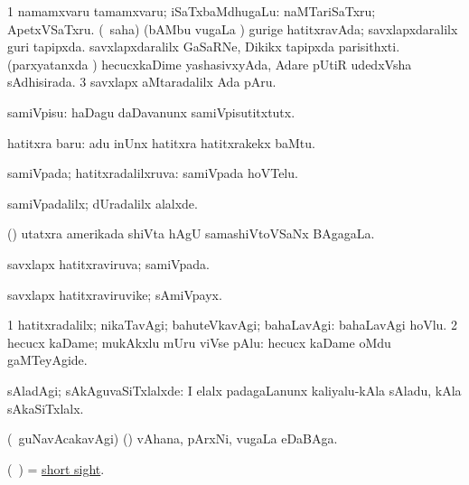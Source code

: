 \noindent
\gl{\pagu}
\bmng
\bnum
\num{1}  namamxvaru tamamxvaru; iSaTxbaMdhugaLu: naMTariSaTxru; ApetxVSaTxru. 
  (\rUpa\ saha) 
\banum
{} (bAMbu \mo vugaLa \vi) gurige hatitxravAda; savxlapxdaralilx guri tapipxda. 
 savxlapxdaralilx GaSaRNe, Dikikx tapipxda parisithxti. 
 (parxyatanxda \vi) hecucxkaDime yashasivxyAda, Adare pUtiR udedxVsha sAdhisirada. 
\eanum
\numie
\num{3}  savxlapx aMtaradalilx Ada pAru. 
\enum
\emng
\eentry

\bentry
{}
\gl{\sakirx}
\bmng
samiVpisu:  haDagu daDavanunx samiVpisutitxtutx. 
\emng

\noindent
\gl{\akirx}
\bmng
hatitxra baru:  adu inUnx hatitxra hatitxrakekx baMtu. 
\emng
\eentry

\bentry
{}
\gl{\gu}
\bmng
samiVpada; hatitxradalilxruva:  samiVpada hoVTelu. 
\emng
\eentry

\bentry
{}
\gl{\kirxvi}
\bmng
samiVpadalilx; dUradalilx alalxde. 
\emng
\eentry

\bentry
{}
\gl{\gu}
\bmng
(\pArxvi) utatxra amerikada shiVta hAgU samashiVtoVSaNx BAgagaLa. 
\emng
\eentry

\bentry
{}
\gl{\gu}
\bmng
savxlapx hatitxraviruva; samiVpada. 
\emng
\eentry

\bentry
{}
\gl{\nA}
\bmng
savxlapx hatitxraviruvike; sAmiVpayx. 
\emng
\eentry

\bentry
{}
\gl{\kirxvi}
\bmng
\bnum
\num{1} hatitxradalilx; nikaTavAgi; bahuteVkavAgi; bahaLavAgi:  bahaLavAgi hoVlu. 
\num{2} hecucx kaDame; mukAkxlu mUru viVse pAlu:  hecucx kaDame oMdu gaMTeyAgide. 
\enum
\emng

\noindent
\gl{\pagu}
\bmng
  sAladAgi; sAkAguvaSiTxlalxde:  I elalx padagaLanunx kaliyalu-kAla sAladu, kAla sAkaSiTxlalx. 
\emng
\eentry

\bentry
{}
\gl{\nA}
\bmng
(\sA\ guNavAcakavAgi) (\birx) vAhana, pArxNi, \mo vugaLa eDaBAga. 
\emng
\eentry

\bentry
{}
\gl{\nA}
\bmng
(\kanmu\ \ame) = \hyperref{kandict_s.pdf}{S}{short sight}{short sight}. 
\emng
\eentry

